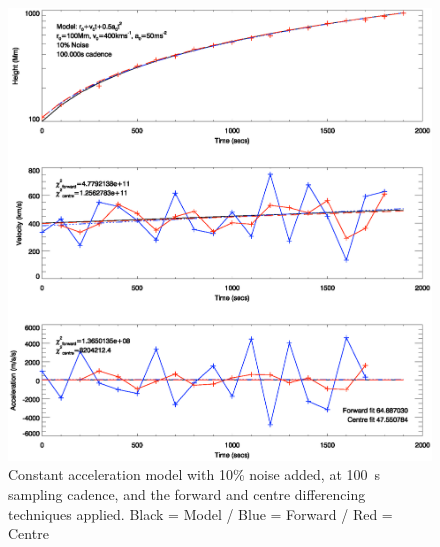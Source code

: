 \documentclass[namedreferences]{SolarPhysics}
\begin{document}
\begin{article}
\begin{figure}
 \centerline{\includegraphics[width=\linewidth]{images/const_a_forward_centre_noise010_cadence100.ps}}
   \caption{Constant acceleration model with 10\% noise added, at 100~s sampling cadence, and the forward and centre differencing techniques applied. Black = Model / Blue = Forward / Red = Centre}
    \label{const_a_forward_centre_noise010_cadence100}
\end{figure}


\end{article}
\end{document}
